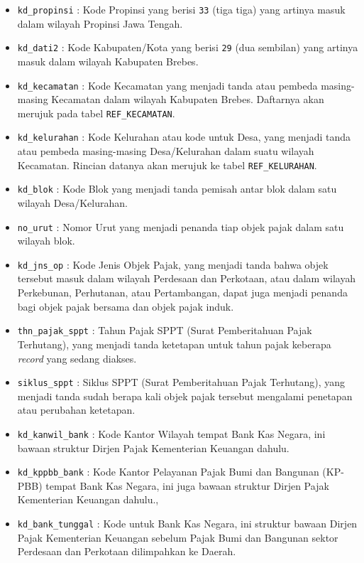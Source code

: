 \begin{itemize}
	\item \texttt{kd\_propinsi} : Kode Propinsi yang berisi \texttt{33} (tiga tiga) yang artinya masuk dalam wilayah Propinsi Jawa Tengah.
	\item \texttt{kd\_dati2} : Kode Kabupaten/Kota yang berisi \texttt{29} (dua sembilan) yang artinya masuk dalam wilayah Kabupaten Brebes.
	\item \texttt{kd\_kecamatan} : Kode Kecamatan yang menjadi tanda atau pembeda masing-masing Kecamatan dalam wilayah Kabupaten Brebes. Daftarnya akan merujuk pada tabel \texttt{REF\_KECAMATAN}.
	\item \texttt{kd\_kelurahan} : Kode Kelurahan atau kode untuk Desa, yang menjadi tanda atau pembeda masing-masing Desa/Kelurahan dalam suatu wilayah Kecamatan. Rincian datanya akan merujuk ke tabel \texttt{REF\_KELURAHAN}.
	\item \texttt{kd\_blok} : Kode Blok yang menjadi tanda pemisah antar blok dalam satu wilayah Desa/Kelurahan.
	\item \texttt{no\_urut} : Nomor Urut yang menjadi penanda tiap objek pajak dalam satu wilayah blok.
	\item \texttt{kd\_jns\_op} : Kode Jenis Objek Pajak, yang menjadi tanda bahwa objek tersebut masuk dalam wilayah Perdesaan dan Perkotaan, atau dalam wilayah Perkebunan, Perhutanan, atau Pertambangan, dapat juga menjadi penanda bagi objek pajak bersama dan objek pajak induk.
	\item \texttt{thn\_pajak\_sppt} : Tahun Pajak SPPT (Surat Pemberitahuan Pajak Terhutang), yang menjadi tanda ketetapan untuk tahun pajak keberapa \textit{record} yang sedang diakses.
	\item \texttt{siklus\_sppt} : Siklus SPPT (Surat Pemberitahuan Pajak Terhutang), yang menjadi tanda sudah berapa kali objek pajak tersebut mengalami penetapan atau perubahan ketetapan.	
	\item \texttt{kd\_kanwil\_bank} : Kode Kantor Wilayah tempat Bank Kas Negara, ini bawaan struktur Dirjen Pajak Kementerian Keuangan dahulu.
	\item \texttt{kd\_kppbb\_bank} : Kode Kantor Pelayanan Pajak Bumi dan Bangunan (KP-PBB) tempat Bank Kas Negara, ini juga bawaan struktur Dirjen Pajak Kementerian Keuangan dahulu.,
	\item \texttt{kd\_bank\_tunggal} : Kode untuk Bank Kas Negara, ini struktur bawaan Dirjen Pajak Kementerian Keuangan sebelum Pajak Bumi dan Bangunan sektor Perdesaan dan Perkotaan dilimpahkan ke Daerah.

\end{itemize}
